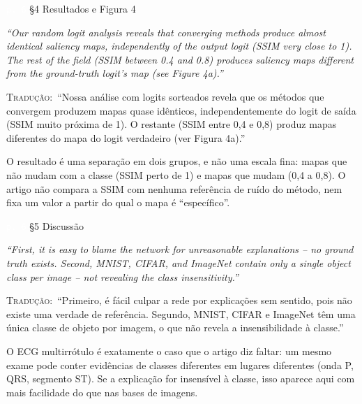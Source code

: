 \documentclass[11pt,a4paper]{article}
\newcommand{\pagechip}[1]{{\setlength{\fboxsep}{1.5pt}\colorbox{cAcc}{\textcolor{white}{\scriptsize\texttt{#1}}}}}
\newenvironment{origquote}{\par\itshape\small}{\par}
\newenvironment{tradquote}{\par\small\textsc{Tradução:}\ }{\par}
\newcommand{\explab}[1]{\par\smallskip{\small\color{cAcc}\textbf{\MakeUppercase{#1}}}\par}
\begin{document}
\begin{citacard}{\pagechip{p. 6} §4 Resultados e Figura 4}
\begin{origquote}“Our random logit analysis reveals that converging methods produce almost identical saliency maps, independently of the output logit (SSIM very close to 1). The rest of the field (SSIM between 0.4 and 0.8) produces saliency maps different from the ground-truth logit's map (see Figure 4a).”\end{origquote}
\begin{tradquote}“Nossa análise com logits sorteados revela que os métodos que convergem produzem mapas quase idênticos, independentemente do logit de saída (SSIM muito próxima de 1). O restante (SSIM entre 0,4 e 0,8) produz mapas diferentes do mapa do logit verdadeiro (ver Figura 4a).”\end{tradquote}
\explab{Explicação}
O resultado é uma separação em dois grupos, e não uma escala fina: mapas que não mudam com a classe (SSIM perto de 1) e mapas que mudam (0,4 a 0,8). O artigo não compara a SSIM com nenhuma referência de ruído do método, nem fixa um valor a partir do qual o mapa é “específico”.
\end{citacard}

\begin{citacard}{\pagechip{p. 6} §5 Discussão}
\begin{origquote}“First, it is easy to blame the network for unreasonable explanations -- no ground truth exists. Second, MNIST, CIFAR, and ImageNet contain only a single object class per image -- not revealing the class insensitivity.”\end{origquote}
\begin{tradquote}“Primeiro, é fácil culpar a rede por explicações sem sentido, pois não existe uma verdade de referência. Segundo, MNIST, CIFAR e ImageNet têm uma única classe de objeto por imagem, o que não revela a insensibilidade à classe.”\end{tradquote}
\explab{Explicação}
O ECG multirrótulo é exatamente o caso que o artigo diz faltar: um mesmo exame pode conter evidências de classes diferentes em lugares diferentes (onda P, QRS, segmento ST). Se a explicação for insensível à classe, isso aparece aqui com mais facilidade do que nas bases de imagens.
\end{citacard}
\end{document}
